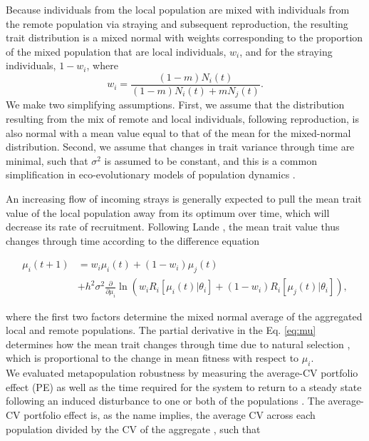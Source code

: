 \documentclass[twocolumn,preprintnumbers,amsmath,amssymb,superscriptaddress]{revtex4}
\begin{document}
\noindent Because individuals from the local population are mixed with individuals from the remote population via straying and subsequent reproduction, the resulting trait distribution is a mixed normal with weights corresponding to the proportion of the mixed population that are local individuals, $w_i$, and for the straying individuals, $1-w_i$, where 
\begin{equation}
w_i=\frac{(1-m)N_i(t)}{(1-m) N_i(t) + m N_j(t)}.
\end{equation}
We make two simplifying assumptions.
First, we assume that the distribution resulting from the mix of remote and local individuals, following reproduction, is also normal with a mean value equal to that of the mean for the mixed-normal distribution.
Second, we assume that changes in trait variance through time are minimal, such that $\sigma^2$ is assumed to be constant, and this is a common simplification in eco-evolutionary models of population dynamics \cite{Lande:1976ga,Schreiber:2011wx,Gibert:tz}.



An increasing flow of incoming strays is generally expected to pull the mean trait value of the local population away from its optimum over time, which will decrease its rate of recruitment.
Following Lande \cite{Lande:1976ga}, the mean trait value thus changes through time according to the difference equation

\begin{align}
  \label{eq:mu}
  \mu_i(t+1) &= w_i\mu_i(t) + (1-w_i)\mu_j(t) \\ \nonumber
  &+ h^2\sigma^2\frac{\partial}{\partial \mu_i}\ln\left(w_i R_i[\mu_i(t)|\theta_i] + (1-w_i)R_i[\mu_j(t)|\theta_i]  \right),
\end{align}

\noindent where the first two factors determine the mixed normal average of the aggregated local and remote populations.
The partial derivative in the Eq. \ref{eq:mu} determines how the mean trait changes through time due to natural selection \cite{Lande:1976ga}, which is proportional to the change in mean fitness with respect to $\mu_i$.
\\

\noindent We evaluated metapopulation robustness by measuring the average-CV portfolio effect (PE) \cite{Anderson:2014cx,Schindler:2015gf} as well as the time required for the system to return to a steady state following an induced disturbance to one or both of the populations \cite{Ovaskainen:2002il}.
The average-CV portfolio effect is, as the name implies, the average CV across each population divided by the CV of the aggregate \cite{Anderson:2013gb}, such that
\end{document}
